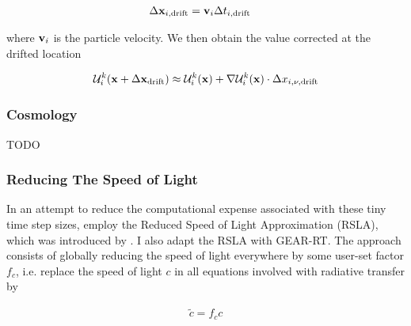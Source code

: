 \begin{align}
\Delta \mathbf{x}_{i,\text{drift}} &= \mathbf{v}_{i} \Delta t_{i,\text{drift}}
\end{align}

where $\mathbf{v}_i$ is the particle velocity. We then obtain the value corrected at the drifted
location

\begin{align}
\mathcal{U}_{i}^k (\mathbf{x} + \Delta \mathbf{x}_{\text{drift}}) \approx \mathcal{U}_{i}^k (\mathbf{x}) + \nabla \mathcal{U}_{i}^k (\mathbf{x}) \cdot \Delta
x_{i,\nu,\text{drift}}
\end{align}









\subsubsection{Cosmology}

TODO








\subsubsection{Reducing The Speed of Light}


In an attempt to reduce the computational expense associated with these tiny time step sizes,
\cite{ramses-rt13} employ the Reduced Speed of Light Approximation (RSLA), which was introduced by
\cite{gnedinMultidimensionalCosmologicalRadiative2001}. I also adapt the RSLA with GEAR-RT. The
approach consists of globally reducing the speed of light everywhere by some user-set factor $f_c$,
i.e. replace the speed of light $c$ in all equations involved with radiative transfer by

\begin{align}
    \tilde{c} = f_c c
\end{align}














